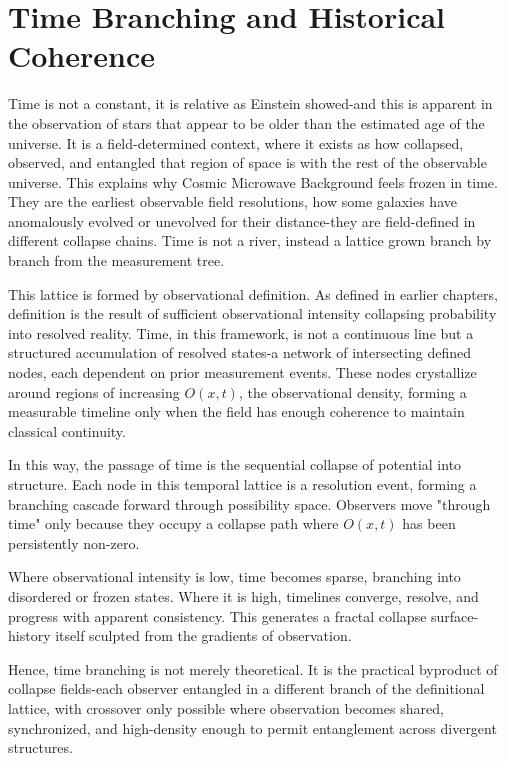 \chapter{Time Branching and Historical Coherence}

Time is not a constant, it is relative as Einstein showed-and this is apparent in the observation of stars that appear to be older than the estimated age of the universe. It is a field-determined context, where it exists as how collapsed, observed, and entangled that region of space is with the rest of the observable universe. This explains why Cosmic Microwave Background feels frozen in time. They are the earliest observable field resolutions, how some galaxies have anomalously evolved or unevolved for their distance-they are field-defined in different collapse chains. Time is not a river, instead a lattice grown branch by branch from the measurement tree.

This lattice is formed by observational definition. As defined in earlier chapters, definition is the result of sufficient observational intensity collapsing probability into resolved reality. Time, in this framework, is not a continuous line but a structured accumulation of resolved states-a network of intersecting defined nodes, each dependent on prior measurement events. These nodes crystallize around regions of increasing $O(x,t)$, the observational density, forming a measurable timeline only when the field has enough coherence to maintain classical continuity.

In this way, the passage of time is the sequential collapse of potential into structure. Each node in this temporal lattice is a resolution event, forming a branching cascade forward through possibility space. Observers move "through time" only because they occupy a collapse path where $O(x,t)$ has been persistently non-zero.

Where observational intensity is low, time becomes sparse, branching into disordered or frozen states. Where it is high, timelines converge, resolve, and progress with apparent consistency. This generates a fractal collapse surface-history itself sculpted from the gradients of observation.

Hence, time branching is not merely theoretical. It is the practical byproduct of collapse fields-each observer entangled in a different branch of the definitional lattice, with crossover only possible where observation becomes shared, synchronized, and high-density enough to permit entanglement across divergent structures.

